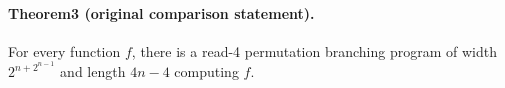 \paragraph{Theorem3 (original comparison statement).} For every function $f$, there is a read-4 permutation branching program of width $2^{n+2^{n-1}}$ and length $4n-4$ computing $f$.
